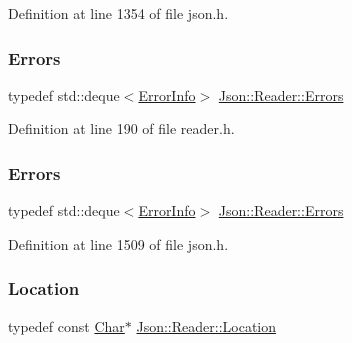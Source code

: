 Definition at line 1354 of file json.\+h.

\hypertarget{class_json_1_1_reader_aae51e8f5bab3f067261c842a3ef858e5}{}\label{class_json_1_1_reader_aae51e8f5bab3f067261c842a3ef858e5} 
\subsubsection{\texorpdfstring{Errors}{Errors}\hspace{0.1cm}{\footnotesize\ttfamily [1/2]}}
{\footnotesize\ttfamily typedef std\+::deque$<$\hyperlink{class_json_1_1_reader_1_1_error_info}{Error\+Info}$>$ \hyperlink{class_json_1_1_reader_aae51e8f5bab3f067261c842a3ef858e5}{Json\+::\+Reader\+::\+Errors}\hspace{0.3cm}{\ttfamily [private]}}



Definition at line 190 of file reader.\+h.

\hypertarget{class_json_1_1_reader_aae51e8f5bab3f067261c842a3ef858e5}{}\label{class_json_1_1_reader_aae51e8f5bab3f067261c842a3ef858e5} 
\subsubsection{\texorpdfstring{Errors}{Errors}\hspace{0.1cm}{\footnotesize\ttfamily [2/2]}}
{\footnotesize\ttfamily typedef std\+::deque$<$\hyperlink{class_json_1_1_reader_1_1_error_info}{Error\+Info}$>$ \hyperlink{class_json_1_1_reader_aae51e8f5bab3f067261c842a3ef858e5}{Json\+::\+Reader\+::\+Errors}\hspace{0.3cm}{\ttfamily [private]}}



Definition at line 1509 of file json.\+h.

\hypertarget{class_json_1_1_reader_a46795b5b272bf79a7730e406cb96375a}{}\label{class_json_1_1_reader_a46795b5b272bf79a7730e406cb96375a} 
\subsubsection{\texorpdfstring{Location}{Location}\hspace{0.1cm}{\footnotesize\ttfamily [1/2]}}
{\footnotesize\ttfamily typedef const \hyperlink{class_json_1_1_reader_a3eec9118f3e9a672ba8348c3a79d0f45}{Char}$\ast$ \hyperlink{class_json_1_1_reader_a46795b5b272bf79a7730e406cb96375a}{Json\+::\+Reader\+::\+Location}}



